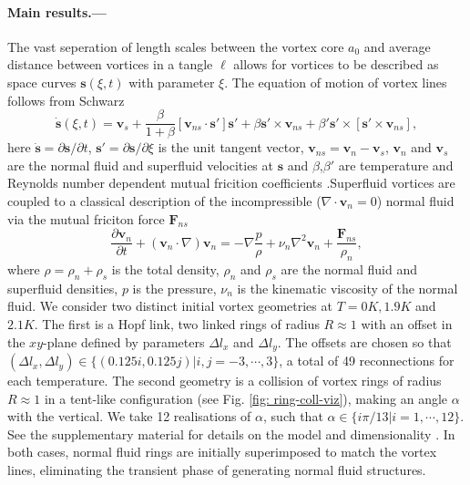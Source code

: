 \documentclass[%
 reprint,
 amsmath,amssymb,
 aps,
 prl,
]{revtex4-2}
\def \s{\mathbf{s}}
\def \v{\mathbf{v}}
\begin{document}
\paragraph*{Main results.---}The vast seperation of length scales between the vortex core $a_0$ and average distance between vortices in a tangle $\ell$ allows for vortices to be described as space curves $\s(\xi,t)$ with parameter $\xi$. The equation of motion of vortex lines follows from Schwarz \cite{schwarzThreedimensionalVortexDynamics1988a}
\begin{equation}
	\dot{\s}(\xi,t) = \v_s + \frac{\beta}{1+\beta}\left[\v_{ns}\cdot \s'\right]\s' + \beta\s'\times\v_{ns}+\beta'\s'\times\left[\s'\times \v_{ns}\right],
\end{equation}
here $\dot{\s}=\partial\s/\partial t$, $\s'=\partial\s/\partial \xi$ is the unit tangent vector, $\v_{ns}=\v_n - \v_s$, $\v_n$ and $\v_s$ are the normal fluid and superfluid velocities at $\s$ and $\beta$,$\beta'$ are temperature and Reynolds number dependent mutual fricition coefficients \cite{galantucciNewSelfconsistentApproach2020b}.Superfluid vortices are coupled to a classical description of the incompressible ($\nabla\cdot\v_n=0$) normal fluid via the mutual friciton force $\mathbf{F}_{ns}$
\begin{equation}
	\frac{\partial \v_n}{\partial t} + (\v_n\cdot\nabla)\v_n = -\nabla\frac{p}{\rho} + \nu_n\nabla^2\v_n + \frac{\mathbf{F}_{ns}}{\rho_n},
\end{equation}
where $\rho=\rho_n + \rho_s$ is the total density, $\rho_n$ and $\rho_s$ are the normal fluid and superfluid densities, $p$ is the pressure, $\nu_n$ is the kinematic viscosity of the normal fluid. We consider two distinct initial vortex geometries at $T=0K,1.9K$ and $2.1K$. The first is a Hopf link, two linked rings of radius $R\approx1$ with an offset in the $xy$-plane defined by parameters $\Delta l_x$ and $\Delta l_y$. The offsets are chosen so that $(\Delta l_x, \Delta l _y) \in \lbrace(0.125i,0.125j)|i,j=-3,\cdots,3 \rbrace$, a total of 49 reconnections for each temperature. The second geometry is a collision of vortex rings of radius $R\approx1$ in a tent-like configuration (see Fig. \ref{fig: ring-coll-viz}), making an angle $\alpha$ with the vertical. We take 12 realisations of $\alpha$, such that $\alpha\in\lbrace i\pi/13|i=1,\cdots,12\rbrace$. See the supplementary material for details on the model and dimensionality \cite{SuppMats}. In both cases, normal fluid rings are initially superimposed to match the vortex lines, eliminating the transient phase of generating normal fluid structures.
\end{document}
